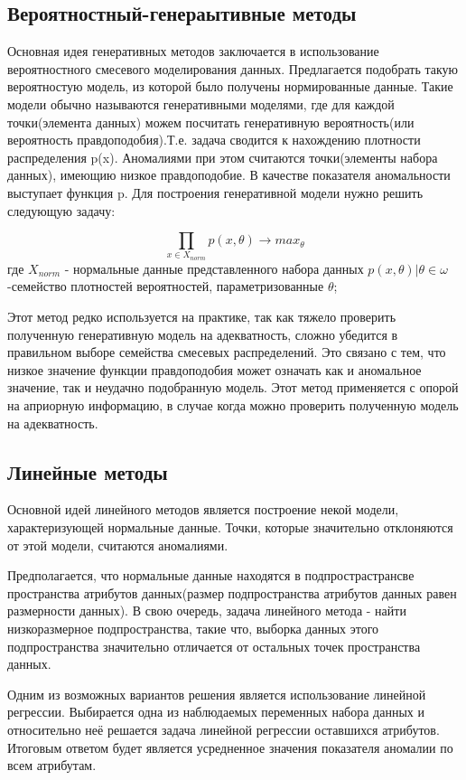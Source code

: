 \subsection{Вероятностный-генераытивные методы}
Основная идея генеративных методов заключается в использование вероятностного смесевого моделирования данных. Предлагается подобрать такую вероятностую модель, из которой было получены нормированные данные. Такие модели обычно называются генеративными моделями, где для каждой точки(элемента данных) можем посчитать генеративную вероятность(или вероятность правдоподобия).Т.е. задача  сводится к нахождению плотности распределения p(x). Аномалиями при этом  считаются точки(элементы набора данных), имеющию низкое правдоподобие. В качестве показателя аномальности выступает функция p.
Для построения генеративной модели нужно решить следующую задачу:
	
	\begin{equation}
	\prod \limits_{x \in X_{norm}} p(x,\theta)  \rightarrow max_\theta
		\end{equation}
		где $ X_{norm}$ - нормальные данные представленного набора данных ${p(x,\theta)|\theta \in \omega}$ -семейство плотностей вероятностей, параметризованные $\theta$;
		
Этот метод редко используется на практике, так как тяжело проверить полученную генеративную модель на адекватность, сложно  убедится в правильном выборе семейства смесевых распределений. Это связано с тем, что низкое значение функции правдоподобия может означать как и аномальное значение, так и неудачно подобранную модель. Этот метод применяется с опорой на априорную информацию, в случае когда можно проверить полученную модель на адекватность.
\subsection{Линейные методы}
Основной идей линейного методов является построение некой  модели, характеризующей нормальные данные. Точки, которые значительно отклоняются от этой модели, считаются аномалиями.

Предполагается, что нормальные данные  находятся в подпрострастрансве пространства атрибутов данных(размер подпространства атрибутов данных равен размерности данных). В свою очередь, задача линейного метода - найти низкоразмерное подпространства, такие что, выборка данных этого подпространства значительно отличается от остальных точек пространства данных.

Одним из возможных вариантов решения является использование линейной регрессии. Выбирается одна из наблюдаемых переменных  набора данных и относительно неё решается задача линейной регрессии оставшихся атрибутов. Итоговым ответом будет является усредненное значения показателя аномалии по всем атрибутам. 

